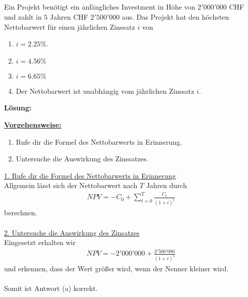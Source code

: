 \subsection*{}
Ein Projekt benötigt ein anfängliches Investment in Höhe von $2'000'000$ CHF und zahlt in $5$ Jahren CHF $2'500'000$ aus.
Das Projekt hat den höchsten Nettobarwert für einen jährlichen
Zinssatz $i$ von
\renewcommand{\labelenumi}{(\alph{enumi})}
\begin{enumerate}
\item $i = 2.25 \%$.
\item $i = 4.56 \%$
\item $i = 6.65 \%$
\item Der Nettobarwert ist unabhängig vom jährlichen Zinssatz $i$.
\end{enumerate}
\textbf{Lösung:}
\begin{mdframed}
\underline{\textbf{Vorgehensweise:}}
\renewcommand{\labelenumi}{\theenumi.}
\begin{enumerate}
\item Rufe dir die Formel des Nettobarwerts in Erinnerung.
\item Untersuche die Auswirkung des Zinssatzes. 
\end{enumerate}
\end{mdframed}

\underline{1. Rufe dir die Formel des Nettobarwerts in Erinnerung}\\
Allgemein lässt sich der Nettobarwert nach $T$ Jahren durch
\begin{align*}
NPV =
-C_0 + \sum \limits_{t=0}^T \frac{C_t}{(1+i)^t}
\end{align*}
berechnen.
\\
\\

\underline{2. Untersuche die Auswirkung des Zinsatzes}\\
Eingesetzt erhalten wir
\begin{align*}
NPV
= -2'000'000 + 
 \frac{2'500'000}{(1+i)^5}
\end{align*}
und erkennen, dass der Wert größer wird, wenn der Nenner kleiner wird.\\
\\
Somit ist Antwort (a) korrekt.
\newpage


